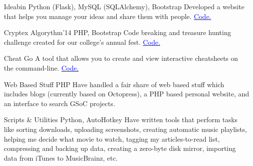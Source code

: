     {Ideabin}
    {}
    {\scriptsize Python (Flask), MySQL (SQLAlchemy), Bootstrap}
    {}
    {
        Developed a website that helps you manage your ideas and share them with people.
        \hfill
        \href{http://github.com/ideabin/ideabin/}{\textcolor{blue}{\scriptsize Code.}}
    }
    \vspace*{0.2\baselineskip}

    {Cryptex}
    {Algorythm'14}
    {\scriptsize PHP, Bootstrap}
    {}
    {
        Code breaking and treasure hunting challenge created for our college's annual fest.
        \hfill
        \href{http://github.com/jdevlabs/cryptex/}{\textcolor{blue}{\scriptsize Code.}}
    }
    \vspace*{0.2\baselineskip}

\cventry{}
    {Cheat}
    {}
    {\scriptsize Go}
    {}
    {
        A tool that allows you to create and view interactive cheatsheets on the command-line.
        \hfill
        \href{http://github.com/dufferzafar/cheat/}{\textcolor{blue}{\scriptsize Code.}}
    }
    \vspace*{0.2\baselineskip}

\cventry{}
    {Web Based Stuff}
    {}
    {\scriptsize PHP}
    {}
    {
        Have handled a fair share of web based stuff which includes
        blogs (currently based on Octopress),
        a PHP based personal website,
        and an interface to search GSoC projects.
    }
    \vspace*{0.2\baselineskip}

\cventry{}
    {Scripts \& Utilities}
    {}
    {\scriptsize Python, AutoHotkey}
    {}
    {
        Have written tools that perform tasks like
        sorting downloads,
        uploading screenshots,
        creating automatic music playlists,
        helping me decide what movie to watch,
        tagging my articles-to-read list,
        compressing and backing up data,
        creating a zero-byte disk mirror,
        importing data from iTunes to MusicBrainz, etc.
    }
    \vspace*{0.2\baselineskip}
